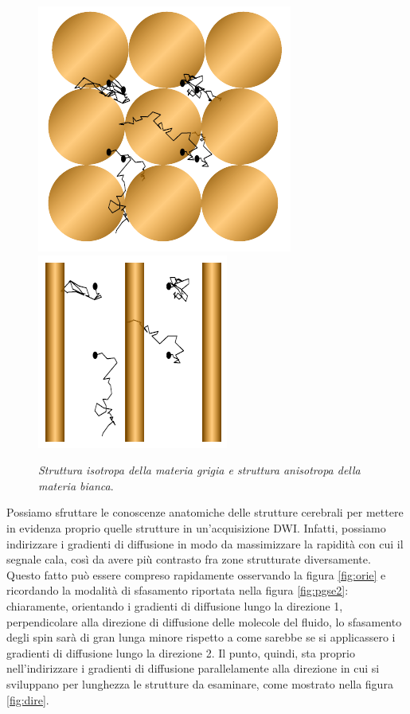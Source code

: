 \documentclass{report}
\newcommand{\figref}[1]{figura \ref{#1}}
\numberwithin{equation}{section}
\numberwithin{figure}{section}
\begin{document}
\begin{figure}[htp]
\centering
\includegraphics[scale=0.74]{immagini/materia.png}\quad\includegraphics[scale=0.94]{immagini/materia1.png}
\caption{\label{fig:materia} \textit{Struttura isotropa della materia grigia e struttura anisotropa della materia bianca}.}
\end{figure}

Possiamo sfruttare le conoscenze anatomiche delle strutture cerebrali per mettere in evidenza proprio quelle strutture in un'acquisizione DWI. Infatti, possiamo indirizzare i gradienti di diffusione in modo da massimizzare la rapidità con cui il segnale cala, così da avere più contrasto fra zone strutturate diversamente. Questo fatto può essere compreso rapidamente osservando la \figref{fig:orie} e ricordando la modalità di sfasamento riportata nella \figref{fig:pgse2}: chiaramente, orientando i gradienti di diffusione lungo la direzione 1, perpendicolare alla direzione di diffusione delle molecole del fluido, lo sfasamento degli spin sarà di gran lunga minore rispetto a come sarebbe se si applicassero i gradienti di diffusione lungo la direzione 2. Il punto, quindi, sta proprio nell'indirizzare i gradienti di diffusione parallelamente alla direzione in cui si sviluppano per lunghezza le strutture da esaminare, come mostrato nella \figref{fig:dire}.
\end{document}
